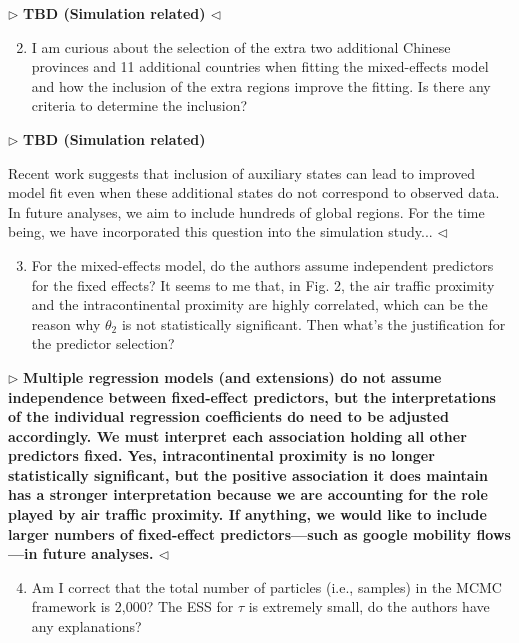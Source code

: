 \documentclass[12pt]{article}
\newenvironment{reply}{$\triangleright$\bfseries}{$\triangleleft$}
\begin{document}
\begin{reply}
TBD (Simulation related)
\end{reply}

\begin{enumerate}	
	  \setcounter{enumi}{1}
	\item I am curious about the selection of the extra two additional Chinese provinces and 11 additional countries when fitting the mixed-effects model and how the inclusion of the extra regions improve the fitting. Is there any criteria to determine the inclusion?
\end{enumerate}

\begin{reply}
TBD (Simulation related)

Recent work \citep{gotovos2021scaling} suggests that inclusion of auxiliary states can lead to improved model fit even when these additional states do not correspond to observed data.  In future analyses, we aim to include hundreds of global regions.  For the time being, we have incorporated this question into the simulation study...
\end{reply}

\begin{enumerate}	
\setcounter{enumi}{2}
	\item For the mixed-effects model, do the authors assume independent predictors for the fixed effects? It seems to me that, in Fig. 2, the air traffic proximity and the intracontinental proximity are highly correlated, which can be the reason why $\theta_2$ is not statistically significant. Then what’s the justification for the predictor selection?
\end{enumerate}

\begin{reply}
Multiple regression models (and extensions) do not assume independence between fixed-effect predictors, but the interpretations of the individual regression coefficients do need to be adjusted accordingly. We must interpret each association holding all other predictors fixed.  Yes, intracontinental proximity is no longer statistically significant, but the positive association it does maintain has a stronger interpretation because we are accounting for the role played by air traffic proximity.    If anything, we would like to include larger numbers of fixed-effect predictors---such as google mobility flows \citep{lemey2021untangling}---in future analyses.
\end{reply}

\begin{enumerate}	
\setcounter{enumi}{3}	
	\item Am I correct that the total number of particles (i.e., samples) in the MCMC framework is 2,000? The ESS for $\tau$ is extremely small, do the authors have any explanations?
\end{enumerate}
\end{document}

